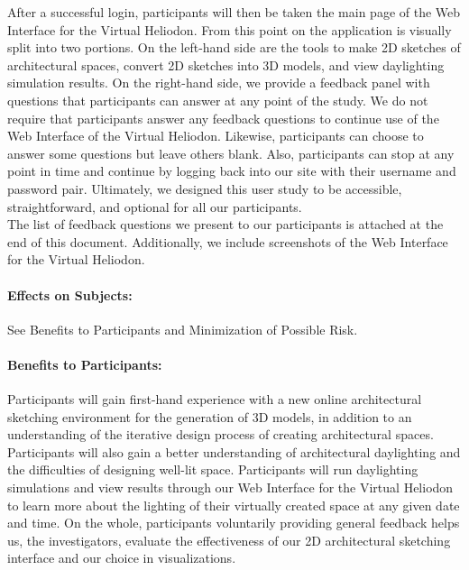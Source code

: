\documentclass[12pt]{article}
\begin{document}
After a successful login, participants will then be taken the main page of the Web Interface for the Virtual Heliodon.
From this point on the application is visually split into two portions. 
On the left-hand side are the tools to make 2D sketches of architectural spaces, convert 2D sketches into 3D models, and view daylighting simulation results. 
On the right-hand side, we provide a feedback panel with questions that participants can answer at any point of the study. 
We do not require that participants answer any feedback questions to continue use of the Web Interface of the Virtual Heliodon. 
Likewise, participants can choose to answer some questions but leave others blank.
Also, participants can stop at any point in time and continue by logging back into our site with their username and password pair.
Ultimately, we designed this user study to be accessible, straightforward, and optional for all our participants. \\

The list of feedback questions we present to our participants is attached at the end of this document. 
Additionally, we include screenshots of the Web Interface for the Virtual Heliodon.

\paragraph{Effects on Subjects:} See Benefits to Participants and Minimization of Possible Risk.

\paragraph{Benefits to Participants:}
%
Participants will gain first-hand experience with a new online architectural sketching environment for the generation of 3D models, in addition to an understanding of the iterative design process of creating architectural spaces. 
Participants will also gain a better understanding of architectural daylighting and the difficulties of designing well-lit space.
Participants will run daylighting simulations and view results through our Web Interface for the Virtual Heliodon to learn more about the lighting of their virtually created space at any given date and time.
On the whole, participants voluntarily providing general feedback helps us, the investigators, evaluate the effectiveness of our 2D architectural sketching interface and our choice in visualizations.
\end{document}
